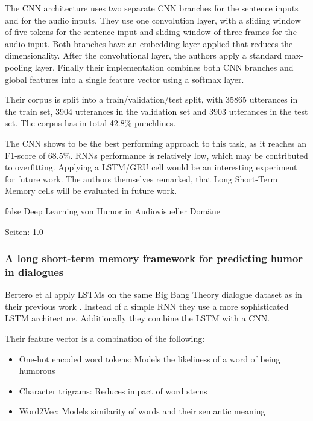 \documentclass[draft,final,oneside]{vutinfth} %
\begin{document}
The CNN architecture uses two separate CNN branches for the sentence inputs and for the audio inputs. They use one convolution layer, with a sliding window of five tokens for the sentence input and sliding window of three frames for the audio input. Both branches have an embedding layer applied that reduces the dimensionality. After the convolutional layer, the authors apply a standard max-pooling layer. Finally their implementation combines both CNN branches and global features into a single feature vector using a softmax layer.

Their corpus is split into a train/validation/test split, with 35865 utterances in the train set, 3904 utterances in the validation set and 3903 utterances in the test set. The corpus has in total 42.8\% punchlines.

The CNN shows to be the best performing approach to this task, as it reaches an F1-score of 68.5\%. RNNs performance is relatively low, which may be contributed to overfitting. Applying a LSTM/GRU cell would be an interesting experiment for future work. The authors themselves remarked, that Long Short-Term Memory cells will be evaluated in future work.

\if false
Deep Learning von Humor in Audiovisueller Domäne

Seiten: 1.0

\cite{Bertero2016DeepLO}
\fi

\subsubsection{A long short-term memory framework for predicting humor in dialogues}

Bertero et al apply LSTMs on the same Big Bang Theory dialogue dataset as in their previous work \cite{Bertero2016DeepLO}. Instead of a simple RNN they use a more sophisticated LSTM architecture. Additionally they combine the LSTM with a CNN.

Their feature vector is a combination of the following:
\begin{itemize}

\item One-hot encoded word tokens: Models the likeliness of a word of being humorous
\item Character trigrams: Reduces impact of word stems
\item Word2Vec: Models similarity of words and their semantic meaning

\end{itemize}
\end{document}
